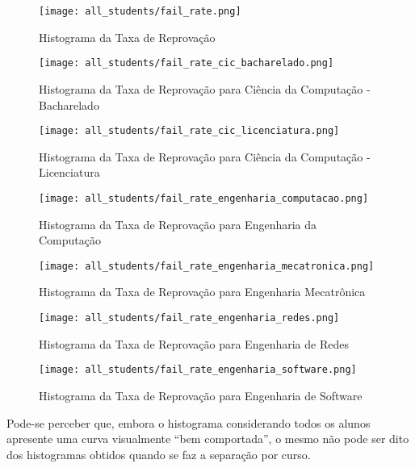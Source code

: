 \begin{figure}[!ht]
    \caption{Histograma da Taxa de Reprovação}
    \centering
    \texttt{[image: all\_students/fail\_rate.png]}
    \label{fail_rate_all}
\end{figure}

\begin{figure}[!ht]
    \caption{Histograma da Taxa de Reprovação para Ciência da Computação - Bacharelado}
    \centering
    \texttt{[image: all\_students/fail\_rate\_cic\_bacharelado.png]}
    \label{fail_rate_cic_b}
\end{figure}

\begin{figure}[!ht]
    \caption{Histograma da Taxa de Reprovação para Ciência da Computação -
    Licenciatura}
    \centering
    \texttt{[image: all\_students/fail\_rate\_cic\_licenciatura.png]}
    \label{fail_rate_cic_lic}
\end{figure}

\begin{figure}[!ht]
    \caption{Histograma da Taxa de Reprovação para Engenharia da Computação}
    \centering
    \texttt{[image: all\_students/fail\_rate\_engenharia\_computacao.png]}
    \label{fail_rate_eng_comp}
\end{figure}

\begin{figure}[!ht]
    \caption{Histograma da Taxa de Reprovação para Engenharia Mecatrônica}
    \centering
    \texttt{[image: all\_students/fail\_rate\_engenharia\_mecatronica.png]}
    \label{fail_rate_eng_mectr}
\end{figure}

\begin{figure}[!ht]
    \caption{Histograma da Taxa de Reprovação para Engenharia de Redes}
    \centering
    \texttt{[image: all\_students/fail\_rate\_engenharia\_redes.png]}
    \label{fail_rate_eng_redes}
\end{figure}

\begin{figure}[!ht]
    \caption{Histograma da Taxa de Reprovação para Engenharia de Software}
    \centering
    \texttt{[image: all\_students/fail\_rate\_engenharia\_software.png]}
    \label{fail_rate_eng_soft}
\end{figure}

Pode-se perceber que, embora o histograma considerando todos os alunos apresente uma
curva visualmente ``bem comportada'', o mesmo não pode ser dito dos histogramas
obtidos
quando se faz a separação por curso.  

